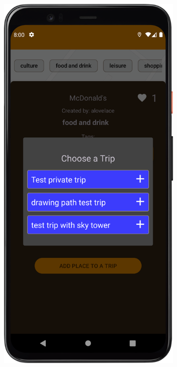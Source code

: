 \begin{figure}[H]
\begin{subfigure}[b]{0.3\textwidth}
            \end{subfigure}
            \hfill
            \begin{subfigure}[b]{0.3\textwidth}
                \centering
                \includegraphics[width=\textwidth]{src/app/existing_trip.png}

\end{subfigure}
\end{figure}
